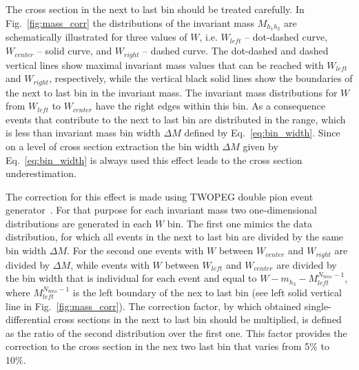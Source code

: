 \documentclass[prc,twocolumn,superscriptaddress,showpacs,amssymb,amsmath,amsfonts,linenumbers,aps]{revtex4-1}
\begin{document}
The cross section in the next to last bin should be treated carefully.
In Fig.~\ref{fig:mass_corr} the distributions of the invariant mass $M_{h_{1}h_{2}}$ are schematically illustrated for three values of $W$, i.e. $W_{left}$ -- dot-dashed curve, $W_{center}$ -- solid curve, and $W_{right}$ -- dashed curve. 
The dot-dashed and dashed vertical lines show  maximal invariant mass values that can be reached with $W_{left}$ and $W_{right}$, respectively, while the vertical black solid lines show the boundaries of the next to last bin in the invariant mass.
The invariant mass distributions for $W$ from $W_{left}$ to $ W_{center}$  have the right edges within this bin.
As a consequence events that contribute to the next to last bin are distributed in the range, which is less than invariant mass bin width $\Delta M$ defined by Eq.~\ref{eq:bin_width}. Since on a level of cross section extraction the bin width $\Delta M$ given by Eq.~\ref{eq:bin_width} is always used this effect leads to the cross section underestimation.



The correction for this effect is made using TWOPEG double pion event generator~\cite{Skorodum:EG}. For that purpose for each invariant mass two  one-dimensional distributions are generated in each $W$ bin. The first one mimics the data distribution, for which all events in the next to last bin are divided by the same bin width $\Delta M$.  For the second one events with $W$ between $W_{center}$ and $W_{right}$ are divided by $\Delta M$, while events with $W$ between $W_{left}$ and $W_{center}$ are divided by the bin width that is individual for each event and equal to $W - m_{h_{3}} - M_{left}^{N_{bins}-1}$, where $M_{left}^{N_{bins}-1}$ is the left boundary of the nex to last bin (see left solid vertical line in Fig.~\ref{fig:mass_corr}). The correction factor, by which obtained single-differential cross sections in the next to last bin should be multiplied, is defined as the ratio of the second distribution over the first one. This factor provides the correction to the cross section in the nex two last bin that varies from 5\% to 10\%. 
\end{document}
